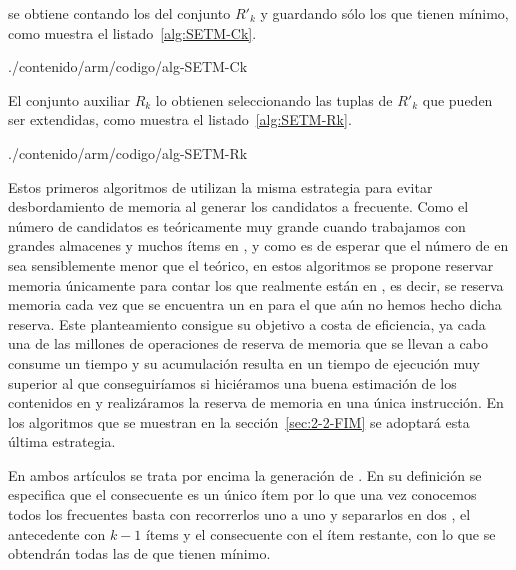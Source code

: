 \aprioriC se obtiene contando los \itemsets del conjunto $R'_k$ y guardando sólo los que tienen \soporte mínimo, como muestra el listado~\ref{alg:SETM-Ck}.


                {./contenido/arm/codigo/alg-SETM-Ck}

El conjunto auxiliar $R_k$ lo obtienen seleccionando las tuplas de $R'_k$ que pueden ser extendidas, como muestra el listado~\ref{alg:SETM-Rk}.

                {./contenido/arm/codigo/alg-SETM-Rk}

Estos primeros algoritmos de \arm utilizan la misma estrategia para evitar desbordamiento de memoria al generar los candidatos a \itemset frecuente. Como el número de candidatos es teóricamente muy grande cuando trabajamos con grandes almacenes \D y muchos ítems en \I, y como es de esperar que el número de \itemsets en \D sea sensiblemente menor que el teórico, en estos algoritmos se propone reservar memoria únicamente para contar los \itemsets que realmente están en \D, es decir, se reserva memoria cada vez que se encuentra un \itemset en \D para el que aún no hemos hecho dicha reserva. Este planteamiento consigue su objetivo a costa de eficiencia, ya cada una de las millones de operaciones de reserva de memoria que se llevan a cabo consume un tiempo y su acumulación resulta en un tiempo de ejecución muy superior al que conseguiríamos si hiciéramos una buena estimación de los \itemsets contenidos en \D y realizáramos la reserva de memoria en una única instrucción. En los algoritmos que se muestran en la sección~\ref{sec:2-2-FIM} se adoptará esta última estrategia.

En ambos artículos se trata por encima la generación de \ars. En su definición se especifica que el consecuente es un único ítem por lo que una vez conocemos todos los \kitemsets frecuentes basta con recorrerlos uno a uno y separarlos en dos \itemsets, el antecedente con $k-1$ ítems y el consecuente con el ítem restante, con lo que se obtendrán todas las \ARs de \D que tienen \soporte mínimo.